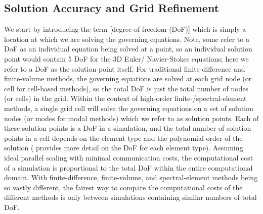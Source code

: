 


\subsection{Solution Accuracy and Grid Refinement}
\label{SEC:Intro:HP_Refinement}


%
We start by introducing the term
[degree-of-freedom (DoF)] which is simply a
location at which we are solving the governing equations.
%
Note, some refer to a DoF as an individual equation being solved at a point, so
an individual solution point would contain 5 DoF for the 3D Euler\slash
Navier-Stokes equations; here we refer to a DoF as the solution point itself.
%
For traditional finite-difference and finite-volume methods, the governing
equations are solved at each grid node (or cell for cell-based methods), so the
total DoF is just the total number of nodes (or cells) in the grid.
%
Within the context of high-order finite-\slash spectral-element methods, a
single grid cell will solve the governing equations on a set of solution nodes
(or modes for modal methods) which we refer to as solution points.
%
Each of these solution points is a DoF in a simulation, and the total number of
solution points in a cell depends on the element type and the polynomial order
of the solution ( provides more detail on the DoF for each
element type).
%
Assuming ideal parallel scaling with minimal communication costs, the
computational cost of a simulation is proportional to the total DoF within the
entire computational domain.
%
With finite-difference, finite-volume, and spectral-element methods being so
vastly different, the fairest way to compare the computational costs of the
different methods is only between simulations containing similar numbers of
total DoF.


